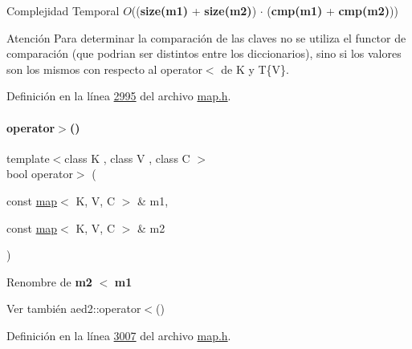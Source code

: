 \begin{DoxyDescription}
\item[Complejidad Temporal]$O$(({\bfseries size(m1)} + {\bfseries size(m2)}) $\cdot$ ({\bfseries cmp(m1)} + {\bfseries cmp(m2)}))
\end{DoxyDescription}

\begin{DoxyAttention}{Atención}
Para determinar la comparación de las claves no se utiliza el functor de comparación (que podrian ser distintos entre los diccionarios), sino si los valores son los mismos con respecto al operator$<$ de K y T\{V\}. 
\end{DoxyAttention}


Definición en la línea \hyperlink{map_8h_source_l02995}{2995} del archivo \hyperlink{map_8h_source}{map.\+h}.

\mbox{\label{classaed2_1_1map_a2000cd874b72034ce7fe730c811b6c63_a2000cd874b72034ce7fe730c811b6c63}} 
\paragraph{\texorpdfstring{operator$>$()}{operator>()}}
{\footnotesize\ttfamily template$<$class K , class V , class C $>$ \\
bool operator$>$ (\begin{DoxyParamCaption}\item[{const \hyperlink{classaed2_1_1map}{map}$<$ K, V, C $>$ \&}]{m1,  }\item[{const \hyperlink{classaed2_1_1map}{map}$<$ K, V, C $>$ \&}]{m2 }\end{DoxyParamCaption})\hspace{0.3cm}{\ttfamily [related]}}



Renombre de {\bfseries m2} $<$ {\bfseries m1} 

\begin{DoxySeeAlso}{Ver también}
aed2\+::operator$<$() 
\end{DoxySeeAlso}


Definición en la línea \hyperlink{map_8h_source_l03007}{3007} del archivo \hyperlink{map_8h_source}{map.\+h}.

\mbox{\label{classaed2_1_1map_afe374b37f17263d0cad3ee19a590d208_afe374b37f17263d0cad3ee19a590d208}} 
